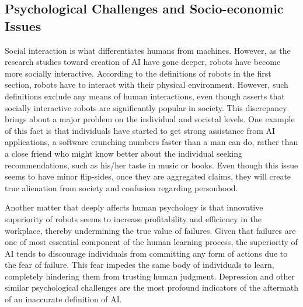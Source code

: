 \documentclass[man]{apa6}
\begin{document}
\subsection{Psychological Challenges and Socio-economic Issues}
Social interaction is what differentiates humans from machines.
However, as the research studies toward creation of AI have gone deeper, robots have become more socially interactive.
According to the definitions of robots in the first section, robots have to interact with their physical environment.
However, such definitions exclude any means of human interactions, even though  asserts that socially interactive robots are significantly popular in society.
This discrepancy brings about a major problem on the individual and societal levels.
One example of this fact is that individuals have started to get strong assistance from AI applications, a software crunching numbers faster than a man can do, rather than a close friend who might know better about the individual seeking recommendations, such as his/her taste in music or books.
Even though this issue seems to have minor flip-sides, once they are aggregated  claims, they will create true alienation from society and confusion regarding personhood. \par
Another matter that deeply affects human psychology is that innovative superiority of robots seems to increase profitability and efficiency in the workplace, thereby undermining the true value of failures.
Given that failures are one of most essential component of the human learning process, the superiority of AI tends to discourage individuals from committing any form of actions due to the fear of failure. 
This fear impedes the same body of individuals to learn, completely hindering them from trusting human judgment.
Depression and other similar psychological challenges are the most profound indicators of the aftermath of an inaccurate definition of AI. \par
\end{document}
